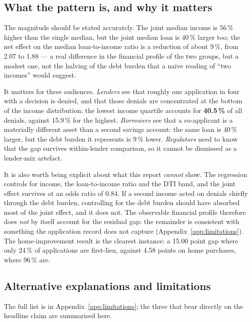 \documentclass[sigconf,balance=false]{acmart}
\begin{document}
\subsection{What the pattern is, and why it matters}

The magnitude should be stated accurately. The joint median income is
56\,\% higher than the single median, but the joint median loan is 40\,\%
larger too; the net effect on the median loan-to-income ratio is a reduction
of about 9\,\%, from 2.07 to 1.88 --- a real difference in the financial
profile of the two groups, but a modest one, not the halving of the debt
burden that a naive reading of ``two incomes'' would suggest.

It matters for three audiences. \emph{Lenders} see that roughly one
application in four with a decision is denied, and that those denials are
concentrated at the bottom of the income distribution: the lowest income
quartile accounts for \textbf{40.5\,\%} of all denials, against 15.9\,\% for
the highest. \emph{Borrowers} see that a co-applicant is a materially
different asset than a second savings account: the same loan is 40\,\%
larger, but the debt burden it represents is 9\,\% lower. \emph{Regulators}
need to know that the gap survives within-lender comparison, so it cannot be
dismissed as a lender-mix artefact.

It is also worth being explicit about what this report \emph{cannot} show.
The regression controls for income, the loan-to-income ratio and the DTI
band, and the joint effect survives at an odds ratio of 0.84. If a second
income acted on denials chiefly through the debt burden, controlling for
the debt burden should have absorbed most of the joint effect, and it does
not. The observable financial profile therefore does \emph{not} by itself
account for the residual gap: the remainder is consistent with something
the application record does not capture (Appendix~\ref{app:limitations}).
The home-improvement result is the clearest instance: a 15.00 point gap
where only 24\,\% of applications are first-lien, against 4.58 points on
home purchases, where 96\,\% are.

\subsection{Alternative explanations and limitations}

The full list is in Appendix~\ref{app:limitations}; the three that bear
directly on the headline claim are summarised here.
\end{document}
